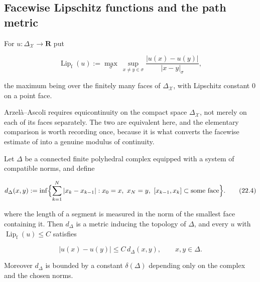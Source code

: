 \subsection{Facewise Lipschitz functions and the path metric}

\begin{definition}
\label{def:ch22-facewise-lipschitz}
For $u:\Delta_{\mathcal X}\to\mathbf R$ put

\[
 \operatorname{Lip}_{\mathrm f}(u)
 :=\max_{\sigma}\ \sup_{x\neq y\in\sigma}
       \frac{|u(x)-u(y)|}{|x-y|_\sigma},
\tag{22.3}\label{eq:ch22-facewise-lipschitz}
\]

the maximum being over the finitely many faces of
$\Delta_{\mathcal X}$, with Lipschitz constant $0$ on a point face.
\end{definition}

Arzel\`a--Ascoli requires equicontinuity on the compact space
$\Delta_{\mathcal X}$, not merely on each of its faces separately.  The two
are equivalent here, and the elementary comparison is worth recording once,
because it is what converts the facewise estimate of
 into a genuine modulus of continuity.

\begin{lemma}
\label{lem:ch22-path-metric}
Let $\Delta$ be a connected finite polyhedral complex equipped with a
system of compatible norms, and define

\[
 d_\Delta(x,y):=\inf\Bigl\{\sum_{k=1}^{N}|x_{k}-x_{k-1}|:
     x_0=x,\ x_N=y,\ [x_{k-1},x_k]\subset\text{some face}\Bigr\}.
\tag{22.4}\label{eq:ch22-path-metric}
\]

where the length of a segment is measured in the norm of the smallest face
containing it.  Then $d_\Delta$ is a metric inducing the topology of
$\Delta$, and every $u$ with
$\operatorname{Lip}_{\mathrm f}(u)\leq C$ satisfies

\[
     |u(x)-u(y)|\leq C\,d_\Delta(x,y),
     \qquad x,y\in\Delta .
\tag{22.5}\label{eq:ch22-global-lipschitz}
\]

Moreover $d_\Delta$ is bounded by a constant $\delta(\Delta)$ depending
only on the complex and the chosen norms.
\end{lemma}

